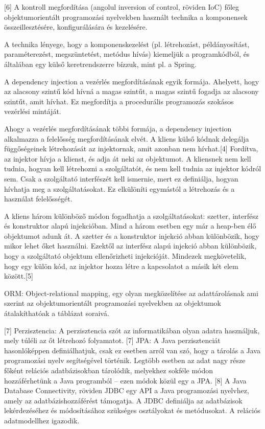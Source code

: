 \documentclass[11pt]{article}
\begin{document}
[6] A kontroll megfordítása (angolul inversion of control, röviden IoC) főleg objektumorientált programozási nyelvekben használt technika a komponensek összeillesztésére, konfigurálására és kezelésére.

A technika lényege, hogy a komponenskezelést (pl. létrehozást, példányosítást, paraméterezést, megszüntetést, metódus hívás) kiemeljük a programkódból, és általában egy külső keretrendszerre bízzuk, mint pl. a Spring.

A dependency injection a vezérlés megfordításának egyik formája. Ahelyett, hogy az alacsony szintű kód hívná a magas szintűt, a magas szintű fogadja az alacsony szintűt, amit hívhat. Ez megfordítja a procedurális programozás szokásos vezérlési mintáját.

Ahogy a vezérlés megfordításának többi formája, a dependency injection alkalmazza a felelősség megfordításának elvét. A kliens külső kódnak delegálja függőségeinek létrehozását az injektornak, amit azonban nem hívhat.[4] Fordítva, az injektor hívja a klienst, és adja át neki az objektumot. A kliensnek nem kell tudnia, hogyan kell létrehozni a szolgáltatót, és nem kell tudnia az injektor kódról sem. Csak a szolgáltató interfészét kell ismernie, mert ez definiálja, hogyan hívhatja meg a szolgáltatásokat. Ez elkülöníti egymástól a létrehozás és a használat felelősségét.

A kliens három különböző módon fogadhatja a szolgáltatásokat: szetter, interfész és konstruktor alapú injekcióban. Mind a három esetben egy már a heap-ben élő objektumot adunk át. A szetter és a konstruktor injekció abban különbözik, hogy mikor lehet őket használni. Ezektől az interfész alapú injekció abban különbözik, hogy a szolgáltató objektum ellenőrizheti injekcióját. Mindezek megkövetelik, hogy egy külön kód, az injektor hozza létre a kapcsolatot a másik két elem között.[5]

ORM: Object-relational mapping, egy olyan megközelítése az adattárolásnak ami szerint az objektumorientált programozási nyelvekben az objektumok átalakíthatóak a táblázat soraivá.

[7] Perzisztencia: A perzisztencia szót az informatikában olyan adatra használjuk, mely túléli az őt létrehozó folyamatot. 
[7] JPA: A Java perzisztenciát hasonlóképpen definiálhatjuk, csak ez esetben arról van szó, hogy a tárolás a Java programozási nyelv segítségével történik. Legtöbb esetben az adat nagy része főként relációs adatbázisokban tárolódik, melyekhez sokféle módon hozzáférhetünk a Java programból – ezen módok közül egy a JPA.
[8] A Java Database Connectivity, röviden JDBC egy API a Java programozási nyelvhez, amely az adatbázishozzáférést támogatja. A JDBC definiálja az adatbázisok lekérdezéséhez és módosításához szükséges osztályokat és metódusokat. A relációs adatmodellhez igazodik.
\end{document}
